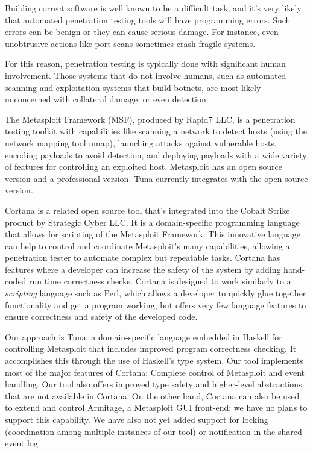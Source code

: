 \documentclass[figure,letterpaper,onefignum]{mysiam}
\begin{document}
Building correct software is well known to be a difficult task, and it's very likely that automated penetration testing tools will have programming errors. Such errors can be benign or they can cause serious damage. For instance, even unobtrusive actions like port scans sometimes crash fragile systems.

For this reason, penetration testing is typically done with significant human involvement. Those systems that do not involve humans, such as automated scanning and exploitation systems that build botnets, are most likely unconcerned with collateral damage, or even detection.

The Metasploit Framework (MSF), produced by Rapid7 LLC, is a penetration testing toolkit with capabilities like scanning a network to detect hosts (using the network mapping tool nmap), launching attacks against vulnerable hosts, encoding payloads to avoid detection, and deploying payloads with a wide variety of features for controlling an exploited host. Metasploit has an open source version and a professional version. Tuna currently integrates with the open source version.

Cortana is a related open source tool that's integrated into the Cobalt Strike product by Strategic Cyber LLC. It is a domain-specific programming language that allows for scripting of the Metasploit Framework. This innovative language can help to control and coordinate Metasploit's many capabilities, allowing a penetration tester to automate complex but repeatable tasks. Cortana has features where a developer can increase the safety of the system by adding hand-coded run time correctness checks. Cortana is designed to work similarly to a \emph{scripting} language such as Perl, which allows a developer to quickly glue together functionality and get a program working, but offers very few language features to ensure correctness and safety of the developed code. 

Our approach is Tuna: a domain-specific language embedded in Haskell for controlling Metasploit that includes improved program correctness checking. It accomplishes this through the use of Haskell's type system. Our tool implements most of the major features of Cortana: Complete control of Metasploit and event handling. Our tool also offers improved type safety and higher-level abstractions that are not available in Cortana. On the other hand, Cortana can also be used to extend and control Armitage, a Metasploit GUI front-end; we have no plans to support this capability.  We have also not yet added support for locking (coordination among multiple instances of our tool) or notification in the shared event log.
\end{document}
